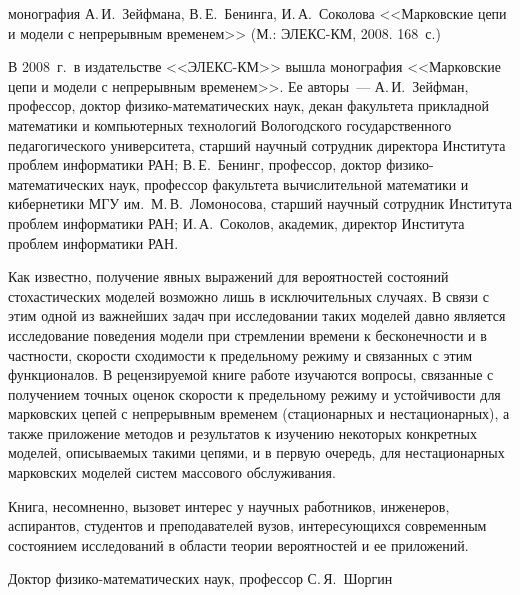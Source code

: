      монография А.\,И.~Зейфмана, В.\,Е.~Бенинга, И.\,А.~Соколова
     <<Марковские цепи и модели с непрерывным временем>> (М.: ЭЛЕКС-КМ, 2008. 
168~с.)
     
     В 2008~г.\ в издательстве <<ЭЛЕКС-КМ>> вышла монография <<Марковские цепи 
и модели с непрерывным временем>>. Ее авторы~--- А.\,И.~Зейфман, профессор, доктор 
физико-математических наук, декан факультета прикладной математики и компьютерных 
технологий Вологодского государственного педагогического университета, старший 
научный сотрудник директора Института проблем информатики РАН; В.\,Е.~Бенинг, 
профессор, доктор физико-математических наук, профессор факультета вычислительной 
математики и кибернетики МГУ им.\ М.\,В.~Ломоносова, старший научный сотрудник 
Института проблем информатики РАН; И.\,А.~Соколов, академик, директор Института 
проблем информатики РАН. 
     
     Как известно, получение явных выражений для вероятностей состояний 
стохастических моделей возможно лишь в исключительных случаях. В связи с этим одной 
из важнейших  задач при исследовании таких моделей давно является исследование 
поведения модели при стремлении времени к бесконечности и в частности, скорости 
сходимости к предельному режиму и связанных с этим функционалов. В рецензируемой 
книге работе изучаются вопросы, связанные с получением точных оценок скорости к 
предельному режиму и устойчивости для марковских цепей с непрерывным временем 
(стационарных и нестационарных), а также приложение методов и результатов к 
изучению некоторых  конкретных моделей, описываемых такими цепями, и в первую 
очередь, для  нестационарных марковских моделей систем массового обслуживания.
     
     Книга, несомненно, вызовет интерес у научных работников, инженеров, аспирантов, 
студентов и преподавателей вузов, интересующихся современным состоянием 
исследований в области теории вероятностей и ее приложений.

     Доктор физико-математических наук, профессор С.\,Я.~Шоргин 
